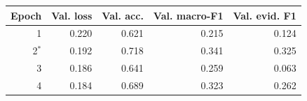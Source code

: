 \begin{tabular}{rrrrr}\toprule
Epoch & Val. loss & Val. acc. & Val. macro-F1 & Val. evid. F1 \\\midrule
1 & 0.220 & 0.621 & 0.215 & 0.124 \\
2$^*$ & 0.192 & 0.718 & 0.341 & 0.325 \\
3 & 0.186 & 0.641 & 0.259 & 0.063 \\
4 & 0.184 & 0.689 & 0.323 & 0.262 \\
\bottomrule\end{tabular}
